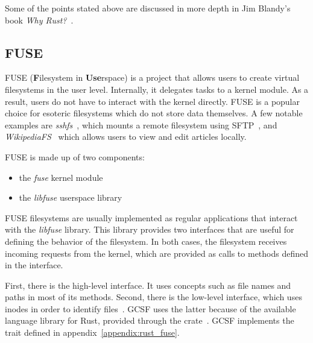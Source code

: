 Some of the points stated above are discussed in more depth in Jim Blandy's book \emph{Why Rust?}~\cite{why_rust}.

\subsection{FUSE}

FUSE (\textbf{F}ilesystem in \textbf{Use}rspace) is a project that allows users to create virtual filesystems in the user level. Internally, it delegates tasks to a kernel module. As a result, users do not have to interact with the kernel directly. FUSE is a popular choice for esoteric filesystems which do not store data themselves. A few notable examples are \emph{sshfs}~\cite{sshfs}, which mounts a remote filesystem using SFTP~\cite{sftp}, and \emph{WikipediaFS}~\cite{wikipediafs} which allows users to view and edit articles locally.

FUSE is made up of two components:
\begin{itemize}
  \itemsep0em
  \item the \textit{fuse} kernel module
  \item the \textit{libfuse} userspace library
\end{itemize}

FUSE filesystems are usually implemented as regular applications that interact with the \textit{libfuse} library. This library provides two interfaces that are useful for defining the behavior of the filesystem. In both cases, the filesystem receives incoming requests from the kernel, which are provided as calls to methods defined in the interface.

First, there is the high-level interface. It uses concepts such as file names and paths in most of its methods. Second, there is the low-level interface, which uses inodes in order to identify files~\cite{tanenbaum}. GCSF uses the latter because of the available language library for Rust, provided through the  crate~\cite{fuse_crate}. GCSF implements the  trait defined in appendix~\ref{appendix:rust_fuse}.

